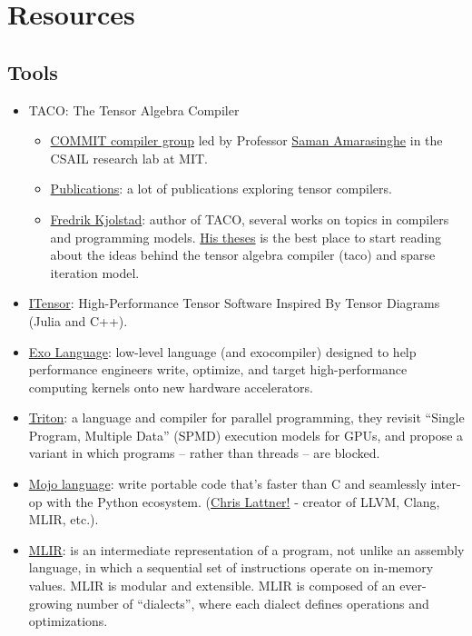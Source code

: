 \section{Resources}\label{sec:resources}

\subsection{Tools}
\begin{itemize}
    \item TACO: The Tensor Algebra Compiler
    \begin{itemize}
        \item \href{http://groups.csail.mit.edu/commit/}{COMMIT compiler group} led by Professor \href{https://scholar.google.com/citations?hl=en&user=cF6i_goAAAAJ&view_op=list_works&sortby=pubdate}{Saman Amarasinghe} in the CSAIL research lab at MIT.
        \item \href{http://tensor-compiler.org/publications.html}{Publications}: a lot of publications exploring tensor compilers.
        \item \href{http://fredrikbk.com/}{Fredrik Kjolstad}: author of TACO, several works on topics in compilers and programming models. \href{http://fredrikbk.com/publications/kjolstad-thesis.pdf}{His theses} is the best place to start reading about the ideas behind the tensor algebra compiler (taco) and sparse iteration model. 
    \end{itemize}
    \item \href{https://itensor.org/}{ITensor}: High-Performance Tensor Software Inspired By Tensor Diagrams (Julia and C++). 
    \item \href{https://exo-lang.dev/}{Exo Language}: low-level language (and exocompiler) designed to help performance engineers write, optimize, and target high-performance computing kernels onto new hardware accelerators.
    \item \href{https://triton-lang.org/main/index.html}{Triton}: a language and compiler for parallel programming, they revisit “Single Program, Multiple Data” (SPMD) execution models for GPUs, and propose a variant in which programs – rather than threads – are blocked.
    \item \href{https://docs.modular.com/mojo/programming-manual.html}{Mojo language}: write portable code that’s faster than C and seamlessly inter-op with the Python ecosystem. (\href{https://www.nondot.org/sabre/}{Chris Lattner!} - creator of LLVM, Clang, MLIR, etc.).
    \item \href{https://mlir.llvm.org}{MLIR}: is an intermediate representation of a program, not unlike an assembly language, in which a sequential set of instructions operate on in-memory values. MLIR is modular and extensible. MLIR is composed of an ever-growing number of ``dialects'', where each dialect defines operations and optimizations.
    

\end{itemize}
